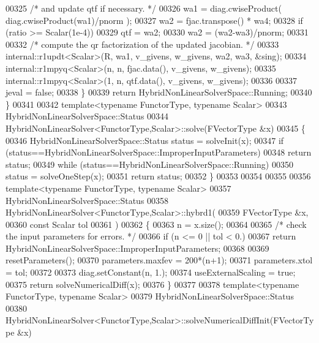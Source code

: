 \begin{DoxyCode}
00325         \textcolor{comment}{/* and update qtf if necessary. */}
00326         wa1 = diag.cwiseProduct( diag.cwiseProduct(wa1)/pnorm );
00327         wa2 = fjac.transpose() * wa4;
00328         \textcolor{keywordflow}{if} (ratio >= Scalar(1e-4))
00329             qtf = wa2;
00330         wa2 = (wa2-wa3)/pnorm;
00331 
00332         \textcolor{comment}{/* compute the qr factorization of the updated jacobian. */}
00333         internal::r1updt<Scalar>(R, wa1, v\_givens, w\_givens, wa2, wa3, &sing);
00334         internal::r1mpyq<Scalar>(n, n, fjac.data(), v\_givens, w\_givens);
00335         internal::r1mpyq<Scalar>(1, n, qtf.data(), v\_givens, w\_givens);
00336 
00337         jeval = \textcolor{keyword}{false};
00338     \}
00339     \textcolor{keywordflow}{return} HybridNonLinearSolverSpace::Running;
00340 \}
00341 
00342 \textcolor{keyword}{template}<\textcolor{keyword}{typename} FunctorType, \textcolor{keyword}{typename} Scalar>
00343 HybridNonLinearSolverSpace::Status
00344 HybridNonLinearSolver<FunctorType,Scalar>::solve(FVectorType  &x)
00345 \{
00346     HybridNonLinearSolverSpace::Status status = solveInit(x);
00347     \textcolor{keywordflow}{if} (status==HybridNonLinearSolverSpace::ImproperInputParameters)
00348         \textcolor{keywordflow}{return} status;
00349     \textcolor{keywordflow}{while} (status==HybridNonLinearSolverSpace::Running)
00350         status = solveOneStep(x);
00351     \textcolor{keywordflow}{return} status;
00352 \}
00353 
00354 
00355 
00356 \textcolor{keyword}{template}<\textcolor{keyword}{typename} FunctorType, \textcolor{keyword}{typename} Scalar>
00357 HybridNonLinearSolverSpace::Status
00358 HybridNonLinearSolver<FunctorType,Scalar>::hybrd1(
00359         FVectorType  &x,
00360         \textcolor{keyword}{const} Scalar tol
00361         )
00362 \{
00363     n = x.size();
00364 
00365     \textcolor{comment}{/* check the input parameters for errors. */}
00366     \textcolor{keywordflow}{if} (n <= 0 || tol < 0.)
00367         \textcolor{keywordflow}{return} HybridNonLinearSolverSpace::ImproperInputParameters;
00368 
00369     resetParameters();
00370     parameters.maxfev = 200*(n+1);
00371     parameters.xtol = tol;
00372 
00373     diag.setConstant(n, 1.);
00374     useExternalScaling = \textcolor{keyword}{true};
00375     \textcolor{keywordflow}{return} solveNumericalDiff(x);
00376 \}
00377 
00378 \textcolor{keyword}{template}<\textcolor{keyword}{typename} FunctorType, \textcolor{keyword}{typename} Scalar>
00379 HybridNonLinearSolverSpace::Status
00380 HybridNonLinearSolver<FunctorType,Scalar>::solveNumericalDiffInit(FVectorType  &x)

\end{DoxyCode}
